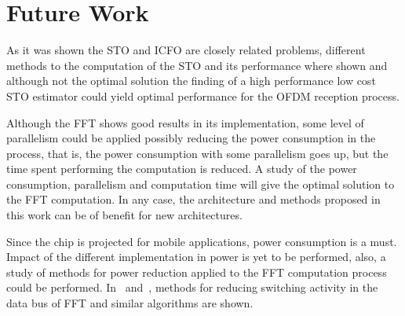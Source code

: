 
\section{Future Work}

As it was shown the STO and ICFO are closely related problems, different methods to the computation of the STO and its performance where shown and although not the optimal solution the finding of a high performance low cost STO estimator could yield optimal performance for the OFDM reception process.  




Although the FFT shows good results in its implementation, some level of parallelism could be applied possibly reducing the power consumption in the process, that is, the power consumption with some parallelism goes up, but the time spent performing the computation is reduced. A study of the power consumption, parallelism and computation time will give the optimal solution to the FFT computation. In any case, the architecture and methods proposed in this work can be of benefit for new architectures.   
 
 Since the chip is projected for mobile applications, power consumption is a must. Impact of the different implementation in power is yet to be performed, also, a study of methods for power reduction applied to the FFT computation process could be performed. In~\cite{daCosta2006} and~\cite{924059}, methods for reducing switching activity in the data bus of FFT and similar algorithms are shown.
 
